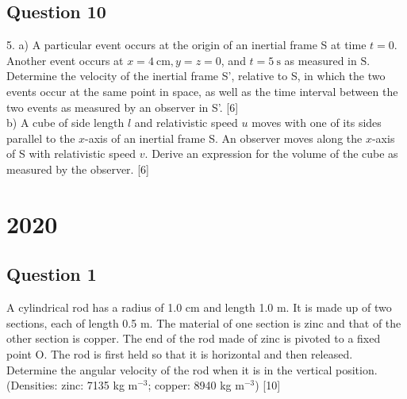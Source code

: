 \documentclass{article}
\begin{document}
\subsection{Question 10}
5. a) A particular event occurs at the origin of an inertial frame S at time $t=0$. Another event occurs at $x=4 \mathrm{~cm}, y=z=0$, and $t=5 \mathrm{~s}$ as measured in $\mathrm{S} .$ Determine the velocity of the inertial frame S', relative to S, in which the two events occur at the same point in space, as well as the time interval between the two events as measured by an observer in S'. [6] \\
b) A cube of side length $l$ and relativistic speed $u$ moves with one of its sides parallel to the $x$-axis of an inertial frame S. An observer moves along the $x$-axis of S with relativistic speed $v$. Derive an expression for the volume of the cube as measured by the observer. [6]



\section{2020}
\subsection{Question 1}
A cylindrical rod has a radius of 1.0 cm and length 1.0 m. It is made up of two sections, each of length 0.5 m. The material of one section is zinc and that of the other section is copper. The end of the rod made of zinc is pivoted to a fixed point O. The rod is first held so that it is horizontal and then released. Determine the angular velocity of the rod when it is in the vertical position. (Densities: zinc: 7135 kg $\text{m}^{-3}$; copper: 8940 kg $\text{m}^{-3}$) [10]
\end{document}
